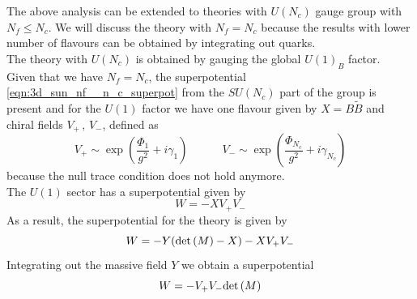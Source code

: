 The above analysis can be extended to theories with $U(N_c)$ gauge group with $N_f \leq N_c$.
We will discuss the theory with $N_f = N_c$ because the results with lower number of flavours can be obtained by integrating out quarks.\\
The theory with $U(N_c)$ is obtained by gauging the global $U(1)_B$ factor.\\
Given that we have $N_f=N_c$, the superpotential \eqref{eqn:3d_sun_nf__n_c_superpot} from the $SU(N_c)$ part of the group is present and for the $U(1)$ factor we have one flavour given by $X = B \tilde{B}$ 
and chiral fields $V_+ \, , \,V_-$, defined as 
\begin{equation}
V_+ \sim \exp{ \left(  \frac{\Phi_1}{g^2} + i \gamma_1 \right) } \qquad \quad V_- \sim \exp{ \left( \frac{\Phi_{N_c}}{g^2} + i \gamma_{N_c} \right) }
\label{eqn:un_moduli_space_coordinates}
\end{equation}
because the null trace condition does not hold anymore.\\
 The $U(1)$ sector has a superpotential given by
 $$ W = - X V_+ V_-$$
As a result, the superpotential for the theory is given by
\begin{equation}
 W = - Y ( \mathrm{det } \,{(M)}  - X) - X V_+ V_- 
 \end{equation} 
Integrating out the massive field $Y$  we obtain a superpotential
\begin{equation}
W = -  V_+ V_-  \mathrm{det } \,{(M)}
\label{eqn:aharony_dual_description_NcNf}
\end{equation}


















